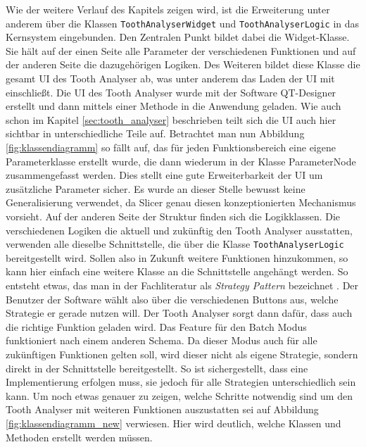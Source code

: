 Wie der weitere Verlauf des Kapitels zeigen wird, ist die Erweiterung unter
anderem über die Klassen \texttt{ToothAnalyserWidget} und \texttt{ToothAnalyserLogic}
in das Kernsystem eingebunden. Den Zentralen Punkt bildet dabei die Widget-Klasse.
Sie hält auf der einen Seite alle Parameter der verschiedenen Funktionen und auf
der anderen Seite die dazugehörigen Logiken. Des Weiteren bildet diese Klasse die
gesamt \ac{UI} des Tooth Analyser ab, was unter anderem das Laden der \ac{UI}
mit einschließt. Die \ac{UI} des Tooth Analyser wurde mit der Software QT-Designer
erstellt und dann mittels einer Methode in die Anwendung geladen. Wie auch schon
im Kapitel \ref{sec:tooth_analyser} beschrieben teilt sich die \ac{UI} auch hier
sichtbar in unterschiedliche Teile auf. Betrachtet man nun Abbildung \ref{fig:klassendiagramm}
so fällt auf, das für jeden Funktionsbereich eine eigene Parameterklasse
erstellt wurde, die dann wiederum in der Klasse ParameterNode zusammengefasst werden.
Dies stellt eine gute Erweiterbarkeit der \ac{UI} um zusätzliche Parameter sicher.
Es wurde an dieser Stelle bewusst keine Generalisierung verwendet, da Slicer genau
diesen konzeptionierten Mechanismus vorsieht. Auf der anderen Seite der Struktur
finden sich die Logikklassen. Die verschiedenen Logiken die aktuell und zukünftig
den Tooth Analyser ausstatten, verwenden alle dieselbe Schnittstelle, die über die
Klasse \texttt{ToothAnalyserLogic} bereitgestellt wird. Sollen also in Zukunft weitere
Funktionen hinzukommen, so kann hier einfach eine weitere Klasse an die
Schnittstelle angehängt werden. So entsteht etwas, das man in der Fachliteratur
als \textit{Strategy Pattern} bezeichnet \citep[vgl.][S.~99]{siebler2014}. Der Benutzer
der Software wählt also über die verschiedenen Buttons aus, welche Strategie er
gerade nutzen will. Der Tooth Analyser sorgt dann dafür, dass auch die richtige
Funktion geladen wird. Das Feature für den Batch Modus funktioniert nach einem anderen
Schema. Da dieser Modus auch für alle zukünftigen Funktionen gelten soll, wird dieser
nicht als eigene Strategie, sondern direkt in der Schnittstelle bereitgestellt. So
ist sichergestellt, dass eine Implementierung erfolgen muss, sie jedoch für alle
Strategien unterschiedlich sein kann. Um noch etwas genauer zu zeigen, welche Schritte
notwendig sind um den Tooth Analyser mit weiteren Funktionen auszustatten sei auf
Abbildung \ref{fig:klassendiagramm_new} verwiesen. Hier wird deutlich, welche Klassen
und Methoden erstellt werden müssen.

